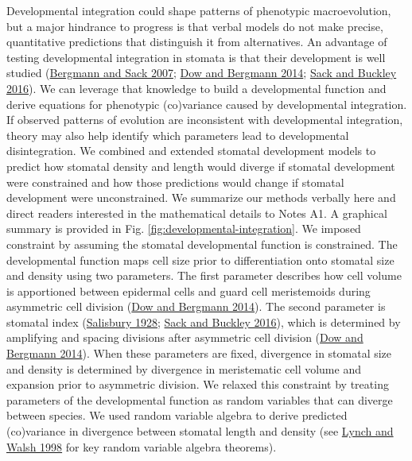 \documentclass[
  12pt,
]{article}
\begin{document}
Developmental integration could shape patterns of phenotypic macroevolution, but a major hindrance to progress is that verbal models do not make precise, quantitative predictions that distinguish it from alternatives. An advantage of testing developmental integration in stomata is that their development is well studied (\protect\hyperlink{ref-bergmann_stomatal_2007}{Bergmann and Sack 2007}; \protect\hyperlink{ref-dow_patterning_2014}{Dow and Bergmann 2014}; \protect\hyperlink{ref-sack_developmental_2016}{Sack and Buckley 2016}). We can leverage that knowledge to build a developmental function and derive equations for phenotypic (co)variance caused by developmental integration. If observed patterns of evolution are inconsistent with developmental integration, theory may also help identify which parameters lead to developmental disintegration. We combined and extended stomatal development models to predict how stomatal density and length would diverge if stomatal development were constrained and how those predictions would change if stomatal development were unconstrained. We summarize our methods verbally here and direct readers interested in the mathematical details to Notes A1. A graphical summary is provided in Fig. \ref{fig:developmental-integration}. We imposed constraint by assuming the stomatal developmental function is constrained. The developmental function maps cell size prior to differentiation onto stomatal size and density using two parameters. The first parameter describes how cell volume is apportioned between epidermal cells and guard cell meristemoids during asymmetric cell division (\protect\hyperlink{ref-dow_patterning_2014}{Dow and Bergmann 2014}). The second parameter is stomatal index (\protect\hyperlink{ref-salisbury_i_1928}{Salisbury 1928}; \protect\hyperlink{ref-sack_developmental_2016}{Sack and Buckley 2016}), which is determined by amplifying and spacing divisions after asymmetric cell division (\protect\hyperlink{ref-dow_patterning_2014}{Dow and Bergmann 2014}). When these parameters are fixed, divergence in stomatal size and density is determined by divergence in meristematic cell volume and expansion prior to asymmetric division. We relaxed this constraint by treating parameters of the developmental function as random variables that can diverge between species. We used random variable algebra to derive predicted (co)variance in divergence between stomatal length and density (see \protect\hyperlink{ref-lynch_genetics_1998}{Lynch and Walsh 1998} for key random variable algebra theorems).
\end{document}
